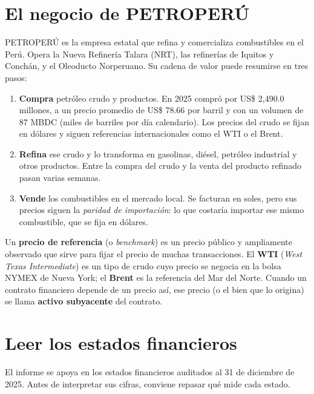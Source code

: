 \section{El negocio de PETROPERÚ}

PETROPERÚ es la empresa estatal que refina y comercializa combustibles en el Perú. Opera la Nueva Refinería Talara (NRT), las refinerías de Iquitos y Conchán, y el Oleoducto Norperuano. Su cadena de valor puede resumirse en tres pasos:

\begin{enumerate}
\item \textbf{Compra} petróleo crudo y productos. En 2025 compró por US\$ 2,490.0 millones, a un precio promedio de US\$ 78.66 por barril y con un volumen de 87 MBDC (miles de barriles por día calendario). Los precios del crudo se fijan en dólares y siguen referencias internacionales como el WTI o el Brent.
\item \textbf{Refina} ese crudo y lo transforma en gasolinas, diésel, petróleo industrial y otros productos. Entre la compra del crudo y la venta del producto refinado pasan varias semanas.
\item \textbf{Vende} los combustibles en el mercado local. Se facturan en soles, pero sus precios siguen la \emph{paridad de importación}: lo que costaría importar ese mismo combustible, que se fija en dólares.
\end{enumerate}

\begin{definicion}
Un \textbf{precio de referencia} (o \emph{benchmark}) es un precio público y ampliamente observado que sirve para fijar el precio de muchas transacciones. El \textbf{WTI} (\emph{West Texas Intermediate}) es un tipo de crudo cuyo precio se negocia en la bolsa NYMEX de Nueva York; el \textbf{Brent} es la referencia del Mar del Norte. Cuando un contrato financiero depende de un precio así, ese precio (o el bien que lo origina) se llama \textbf{activo subyacente} del contrato.
\end{definicion}

\section{Leer los estados financieros}

El informe se apoya en los estados financieros auditados al 31 de diciembre de 2025. Antes de interpretar sus cifras, conviene repasar qué mide cada estado.

